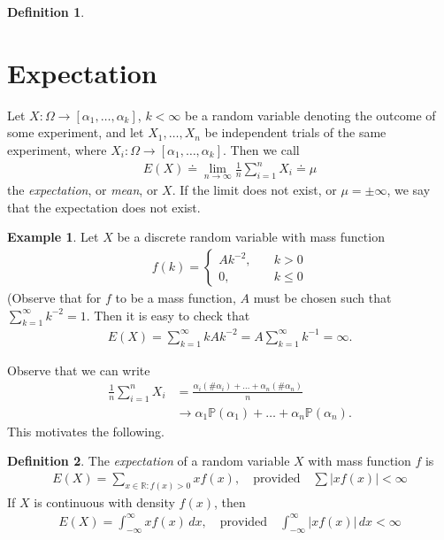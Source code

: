\documentclass[12pt]{article}
\newcommand{\rr}{\mathbb{R}}
\newcommand{\prob}{\mathbb{P}}
\theoremstyle{plain}
\theoremstyle{definition}
\newtheorem*{definition}{Definition}
\newtheorem*{example}{Example}
\theoremstyle{remark}
\numberwithin{equation}{section}  %
\begin{document}
\begin{definition}
\section{Expectation}
Let $X: \Omega \to [\alpha_1, \ldots, \alpha_k]$, $k < \infty$ be a random
variable denoting the outcome of some experiment, and let $X_1, \ldots, X_n$ be independent trials
of the same experiment, where $X_i:
\Omega \to [\alpha_1, \ldots, \alpha_k]$. Then we 
call
\begin{align*}
E(X) \doteq \lim_{n \to \infty} \frac{1}{n} \sum_{i =1}^n X_i \doteq \mu 
\end{align*}
the \emph{expectation}, or \emph{mean}, or $X$. If the limit does not exist,
or $\mu = \pm \infty$, we say that the expectation does not exist.
\end{definition}
\begin{example}
Let $X$ be a discrete random variable with mass function 
\begin{align*}
f(k) = \begin{cases}
Ak^{-2},  \quad &k > 0
\\
0, \quad & k \le 0
\end{cases}
\end{align*}
(Observe that for $f$ to be a mass function, $A$ must be chosen such that
$\sum_{k = 1}^{\infty} k^{-2} = 1$.
Then it is easy to check that
\begin{align*}
E(X) = \sum_{k=1}^{\infty} k Ak^{-2} = A \sum_{k=1}^{\infty} k^{-1} = \infty.
\end{align*}

\end{example}
Observe that we can write
\begin{align*}
\frac{1}{n} \sum_{i = 1}^n X_i
& = \frac{\alpha_i (\#\alpha_i) + \ldots +
\alpha_n (\#\alpha_n)}{n}
\\
& \to \alpha_1 \prob(\alpha_1) + \ldots + \alpha_n \prob(\alpha_n).
\end{align*}
This motivates the following.
\begin{definition}
The \emph{expectation} of a random variable $X$ with mass function $f$ is
\begin{align*}
E(X) = \sum_{x \in \rr: f(x) > 0} x f(x), \quad \text{provided} \quad \sum |x
f(x) | <
\infty
\end{align*}
If $X$ is continuous with density $f(x)$, then
\begin{align*}
E(X) = \int_{-\infty}^{\infty} xf(x) \, dx, \quad \text{provided} \quad
\int_{-\infty}^{\infty} |xf(x)| \, dx < \infty
\end{align*}
\end{definition}
\end{document}
